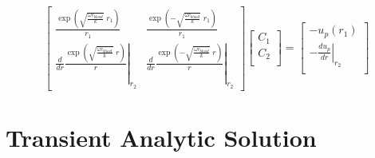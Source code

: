 \documentclass{article}         %
\theoremstyle{definition}
\theoremstyle{remark}
\begin{document}
\[
\begin{bmatrix}
    \frac{\exp\left( \sqrt{\frac{\omega c_\textit{blood}}{k}} \; r_1 \right)}{r_1}  
  & 
    \frac{\exp\left(-\sqrt{\frac{\omega c_\textit{blood}}{k}} \; r_1 \right)}{r_1}  
  \\
  \left.
   \frac{d}{dr}
    \frac{\exp\left( \sqrt{\frac{\omega c_\textit{blood}}{k}} \; r \right)}{r}  
  \right|_{r_2}
  & 
  \left.
   \frac{d}{dr}
    \frac{\exp\left(-\sqrt{\frac{\omega c_\textit{blood}}{k}} \; r \right)}{r}  
  \right|_{r_2}
\end{bmatrix}
\begin{bmatrix}
  C_1 \\
  C_2 \\
\end{bmatrix}
= 
\begin{bmatrix}
       - u_p(r_1)     \\
  - \left. \frac{d u_p}{dr} 
  \right|_{r_2}\\
\end{bmatrix}
\]
\section{Transient Analytic Solution}
\end{document}
